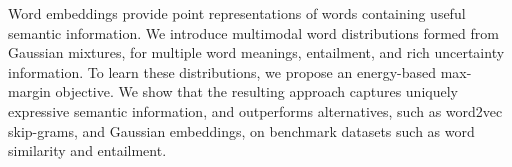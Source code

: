Word embeddings provide point representations of words containing useful semantic information. We introduce multimodal word distributions formed from Gaussian mixtures, for multiple word meanings, entailment, and rich uncertainty information.  To learn these distributions, we propose an energy-based max-margin objective. We show that the resulting approach captures uniquely  expressive semantic information, and outperforms alternatives, such as word2vec skip-grams, and Gaussian embeddings, on benchmark datasets such as word similarity and entailment.
